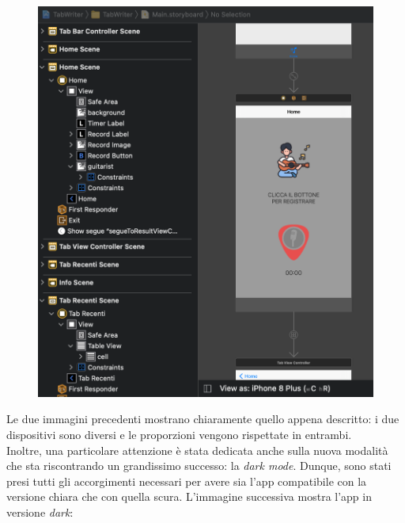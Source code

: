 \begin{figure}[H]
	\centering
	\includegraphics[scale=0.20]{./images/img3.png}
\end{figure}
Le due immagini precedenti mostrano chiaramente quello appena descritto: i due dispositivi sono diversi e le proporzioni vengono rispettate in entrambi.\\
\newline
Inoltre, una particolare attenzione è stata dedicata anche sulla nuova modalità che sta riscontrando un grandissimo successo: la \textit{dark mode}. Dunque, sono stati presi tutti gli accorgimenti necessari per avere sia l'app compatibile con la versione chiara che con quella scura. L'immagine successiva mostra l'app in versione \textit{dark}:
